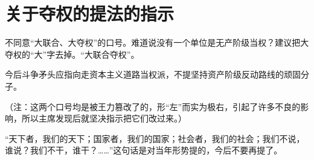 \section[关于夺权的提法的指示（一九六七年二月二十七日）]{关于夺权的提法的指示}


不同意“大联合、大夺权”的口号。难道说没有一个单位是无产阶级当权？建议把大夺权的“大”字去掉。“大联合夺权”。

今后斗争矛头应指向走资本主义道路当权派，不提坚持资产阶级反动路线的顽固分子。

（注：这两个口号均是被王力篡改了的，形“左”而实为极右，引起了许多不良的影响，所以主席发现后就坚决指示把它们改过来。）

\par

“天下者，我们的天下；国家者，我们的国家；社会者，我们的社会；我们不说，谁说？我们不干，谁干？……”这句话是对当年形势提的，今后不要再提了。



